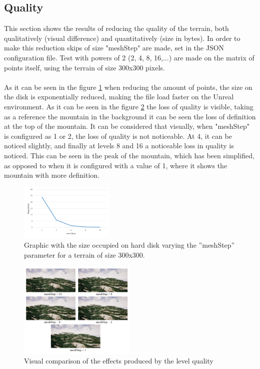 \documentclass[10pt,a4paper,twocolumn,twoside]{article}
\begin{document}
\subsection{Quality}
\label{qualitat}
This section shows the results of reducing the quality of the terrain, both qualitatively (visual difference) and quantitatively (size in bytes). In order to make this reduction skips of size "meshStep" are made, set in the JSON configuration file. Test with powers of 2 (2, 4, 8, 16,...) are made on the matrix of points itself, using the terrain of size 300x300 pixels.
\\
\\
As it can be seen in the figure \ref{fig-qualitatmegas} when reducing the amount of points, the size on the disk is exponentially reduced, making the file load faster on the Unreal environment. As it can be seen in the figure \ref{fig-qualityvisual}  the loss of quality is visible, taking as a reference the mountain in the background it can be seen the loss of definition at the top of the mountain. It can be considered that visually, when "meshStep" is configured as 1 or 2, the loss of quality is not noticeable. At 4, it can be noticed slightly, and finally at levels 8 and 16 a noticeable loss in quality is noticed. This can be seen in the peak of the mountain, which has been simplified, as opposed to when it is configured with a value of 1, where it shows the mountain with more definition.

\begin{figure}[!h]
\centering
  	\includegraphics[width=0.4\textwidth]{qualitatmegas}
	\caption{Graphic with the size occupied on hard disk varying the ''meshStep'' parameter for a terrain of size 300x300.}
	\label{fig-qualitatmegas}
\end{figure}

\begin{figure}[!h]
\centering
  	\includegraphics[width=0.5\textwidth]{quality/quality}
	\caption{Visual comparison of the effects produced by the level quality}
	\label{fig-qualityvisual}
\end{figure}
\end{document}
